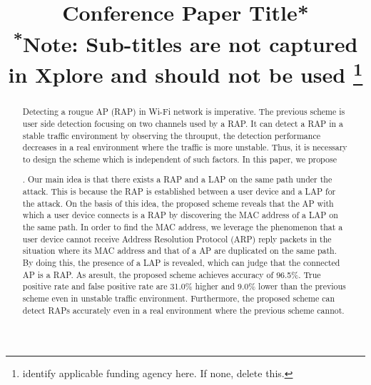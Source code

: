 \documentclass[conference]{IEEEtran}
\begin{document}
\title{Conference Paper Title*\\
{\footnotesize \textsuperscript{*}Note: Sub-titles are not captured in Xplore and
should not be used}
\thanks{identify applicable funding agency here. If none, delete this.}
}

\author{
\and
{}
\and
{}
\and

}

\maketitle

\begin{abstract}
Detecting a rougue AP (RAP) in Wi-Fi network is imperative.
The previous scheme is user side detection focusing on two channels used by a RAP.
It can detect a RAP in a stable traffic environment by observing the throuput, the detection performance decreases in a real environment where the traffic is more unstable.
Thus, it is necessary to design the scheme which is independent of such factors.
    In this paper, we propose \title{} .
Our main idea is that there exists a RAP and a LAP on the same path under the attack.
This is because the RAP is established between a user device and a LAP for the attack.
On the basis of this idea, the proposed scheme reveals that the AP with which a user device connects is a RAP by discovering the MAC address of a LAP on the same path.
In order to find the MAC address, we leverage the phenomenon that a user device cannot receive Address Resolution Protocol (ARP) reply packets in the situation where its MAC address and that of a AP are duplicated on the same path.
By doing this, the presence of a LAP is revealed, which can judge that the connected AP is a RAP.
As aresult, the proposed scheme achieves accuracy of 96.5\%.
True positive rate and false positive rate are 31.0\% higher and 9.0\% lower than the previous scheme even in unstable traffic environment.
Furthermore, the proposed scheme can detect RAPs accurately even in a real environment where the previous scheme cannot.
\end{abstract}
\end{document}
